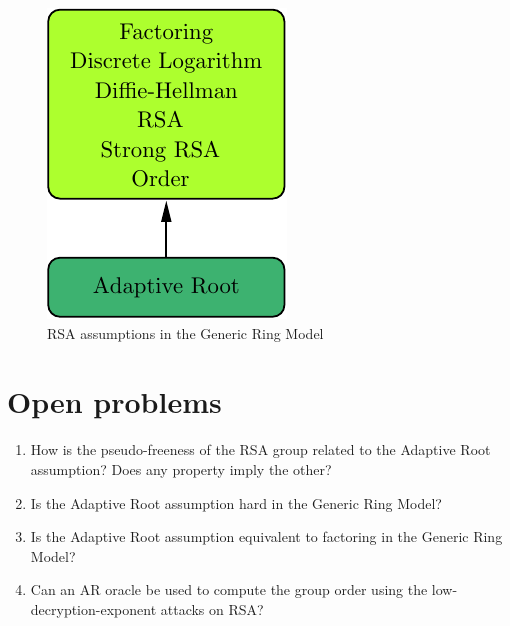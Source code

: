 \documentclass[a4paper]{article}
\begin{document}
\begin{figure}
    \centering
    \includegraphics[scale=0.8]{pics/GRA-assum.pdf}
    \caption{RSA assumptions in the Generic Ring Model}
    \label{fig:gra}
\end{figure}
\section{Open problems}

\begin{enumerate}
    \item How is the pseudo-freeness of the RSA group related to the Adaptive Root assumption? Does any property imply the other?
    \item Is the Adaptive Root assumption hard in the Generic Ring Model?
    \item Is the Adaptive Root assumption equivalent to factoring in the Generic Ring Model? 
    \item Can an AR oracle be used to compute the group order using the low-decryption-exponent attacks on RSA?
\end{enumerate}



\end{document}
